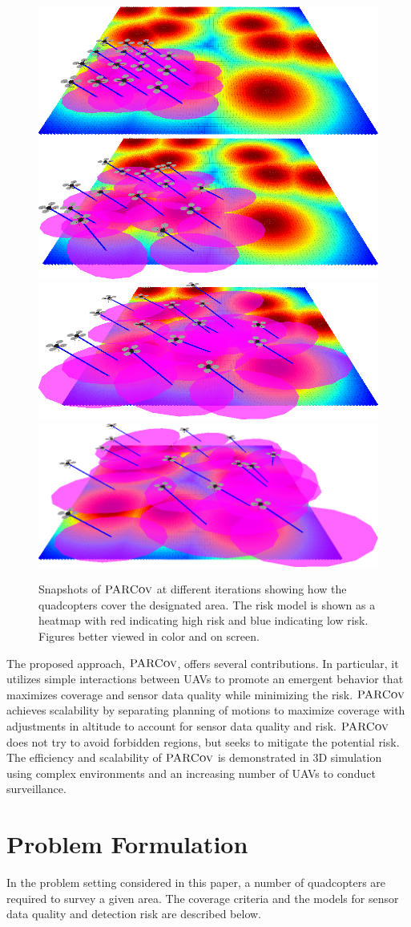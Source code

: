 \documentclass[letterpaper, 10pt, conference]{ieeeconf}
\newcommand{\Function}[1]{\ensuremath{{ \textsc{#1}}}}
\newcommand{\Name}{\Function{\small{PARCov}}}
\begin{document}
\begin{figure}
\includegraphics[width=0.49\columnwidth]{usef/rover1.png}
\includegraphics[width=0.49\columnwidth]{usef/rover2.png}\\
\includegraphics[width=0.49\columnwidth]{usef/rover3.png}
\includegraphics[width=0.49\columnwidth]{usef/rover4.png}
\caption{Snapshots of $\Name$ at different iterations showing how the
  quadcopters cover the designated area. The risk model is shown as a heatmap with red indicating high risk and blue indicating low risk. Figures better viewed in color and on screen.}
\label{fig:cover}
\end{figure}


The proposed approach, $\Name$, offers several contributions. In
particular, it utilizes simple interactions between UAVs to promote an
emergent behavior that maximizes coverage and sensor data quality
while minimizing the risk.  $\Name$ achieves scalability by separating
planning of motions to maximize coverage with adjustments in altitude
to account for sensor data quality and risk. $\Name$ does not try to
avoid forbidden regions, but seeks to mitigate the potential risk. The
efficiency and scalability of $\Name$ is demonstrated in 3D simulation
using complex environments and an increasing number of UAVs to conduct
surveillance.


\section{Problem Formulation}
\label{sec:Problem}
In the problem setting considered in this paper, a number of
quadcopters  are required to survey a given area. The
coverage criteria and the models for sensor data quality and
detection risk are described below.
\end{document}
